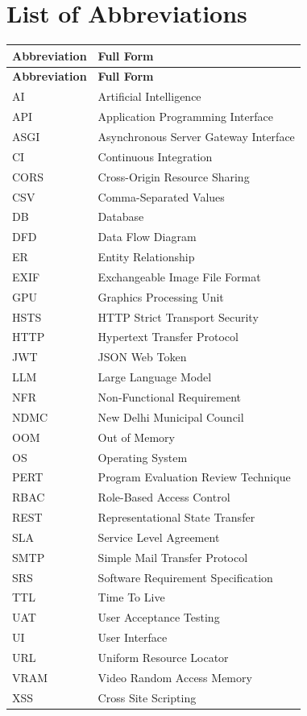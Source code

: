 \chapter*{List of Abbreviations}
\label{chap:list-abbreviations}

\small
\begin{xltabular}{\textwidth}{|>{\RaggedRight\arraybackslash}p{0.24\textwidth}|>{\RaggedRight\arraybackslash}X|}
\hline
\textbf{Abbreviation} & \textbf{Full Form} \\ \hline
\endfirsthead
\hline
\textbf{Abbreviation} & \textbf{Full Form} \\ \hline
\endhead
AI & Artificial Intelligence \\ \hline
API & Application Programming Interface \\ \hline
ASGI & Asynchronous Server Gateway Interface \\ \hline
CI & Continuous Integration \\ \hline
CORS & Cross-Origin Resource Sharing \\ \hline
CSV & Comma-Separated Values \\ \hline
DB & Database \\ \hline
DFD & Data Flow Diagram \\ \hline
ER & Entity Relationship \\ \hline
EXIF & Exchangeable Image File Format \\ \hline
GPU & Graphics Processing Unit \\ \hline
HSTS & HTTP Strict Transport Security \\ \hline
HTTP & Hypertext Transfer Protocol \\ \hline
JWT & JSON Web Token \\ \hline
LLM & Large Language Model \\ \hline
NFR & Non-Functional Requirement \\ \hline
NDMC & New Delhi Municipal Council \\ \hline
OOM & Out of Memory \\ \hline
OS & Operating System \\ \hline
PERT & Program Evaluation Review Technique \\ \hline
RBAC & Role-Based Access Control \\ \hline
REST & Representational State Transfer \\ \hline
SLA & Service Level Agreement \\ \hline
SMTP & Simple Mail Transfer Protocol \\ \hline
SRS & Software Requirement Specification \\ \hline
TTL & Time To Live \\ \hline
UAT & User Acceptance Testing \\ \hline
UI & User Interface \\ \hline
URL & Uniform Resource Locator \\ \hline
VRAM & Video Random Access Memory \\ \hline
XSS & Cross Site Scripting \\ \hline
\end{xltabular}
